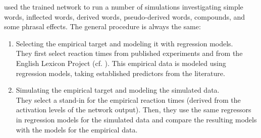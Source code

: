 



\citet{Baayenetal:2011} used the trained network to run a number of
simulations investigating simple words, inflected words, derived words, pseudo-derived words, compounds, and some phrasal effects. The general procedure is always the same:
\begin{enumerate}
\item Selecting
the empirical target and modeling it with regression models. \\
They first select reaction times from published  experiments and
from the English Lexicon Project (cf. \citealt{Balotaetal:2007}). This
empirical data is modeled using regression models, taking
established predictors from the literature.
\item Simulating the empirical target and modeling the simulated
  data.\\ They select a stand-in for the empirical reaction times
  (derived from the activation levels of the network output). Then,
  they use the same regressors in regression models for the simulated data and compare the
  resulting models with the models for the empirical data. 
\end{enumerate}

